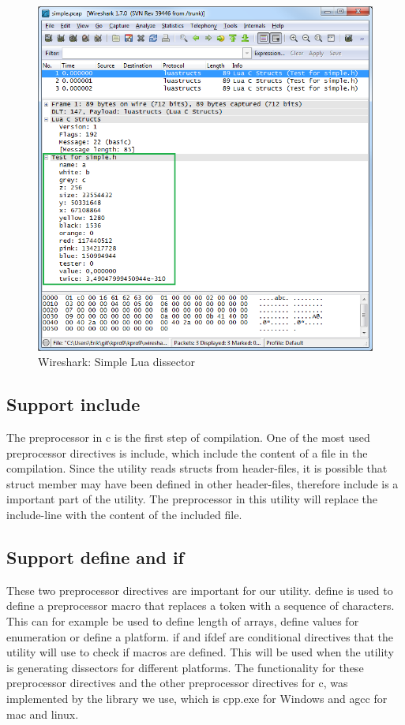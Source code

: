 \begin{figure}[ht]
	\includegraphics[width=\textwidth]{./sprints/img/wireshark_simple}
	\caption{Wireshark: Simple Lua dissector\label{fig:sp1wsstruct}}
\end{figure}

\subsection{Support \gls{include}}
The \gls{preprocessor} in \Gls{c} is the first step of compilation. One of the most used 
\gls{preprocessor} directives is \gls{include}, which include the content of a file 
in the compilation. Since the \gls{utility} reads \glspl{struct} from \gls{header}-files, it is 
possible that \gls{struct} \gls{member} may have been defined in other \gls{header}-files, 
therefore \gls{include} is a important part of the \gls{utility}. The \gls{preprocessor} in 
this \gls{utility} will replace the \gls{include}-line with the content of the included file.

\subsection{Support \gls{define} and \gls{if}}
These two \gls{preprocessor} directives are important for our \gls{utility}. \gls{define} is 
used to define a \gls{preprocessor} macro that replaces a token with a 
sequence of characters. This can for example be used to define length of 
\glspl{array}, define values for enumeration or define a platform. \gls{if} and \gls{ifdef} 
are conditional directives that the \gls{utility} will use to check if macros are 
defined. This will be used when the \gls{utility} is generating \glspl{dissector} for 
different platforms. The functionality for these \gls{preprocessor} directives and 
the other \gls{preprocessor} directives for \Gls{c}, was implemented by the \gls{library} we 
use, which is cpp.exe for \Gls{Windows} and \gls{agcc} for \Gls{mac} and \Gls{linux}.

